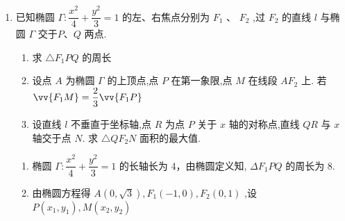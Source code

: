 \begin{enumerate}
\begin{jieda}
        同理,用 $- \dfrac{1}{k}$ 代上式中的 $k$ ,得 $\left| {AB}\right|  = \dfrac{2{a}^{2}\sqrt{1 + {k}^{2}}}{{a}^{2} + {k}^{2}}$ .
        
        由 $\left| {BC}\right|  = \left| {AB}\right|$ ,得 $\left| k\right| \left( {{a}^{2} + {k}^{2}}\right)  = 1 + {a}^{2}{k}^{2}$ . 又 $k < 0$ ,得 $\left( {k + 1}\right) \left\lbrack  {{k}^{2} + \left( {{a}^{2} - 1}\right) k}+1\right\rbrack  = 0$ . 
        
        当 ${\left( {a}^{2} - 1\right) }^{2} - 4 < 0$ ,即 $1 < a < \sqrt{3}$ 时,方程$\left( {k + 1}\right) \left\lbrack  {{k}^{2} + \left( {{a}^{2} - 1}\right) k}+1\right\rbrack  = 0$有唯一解 $k =  - 1$ ; 
        
        当 $a = \sqrt{3}$ 时,方程 ${k}^{2} + \left( {{a}^{2} - 1}\right) k + 1 = 0$ 的解为 $k =  - 1$ ,此时方程$\left( {k + 1}\right) \left\lbrack  {{k}^{2} + \left( {{a}^{2} - 1}\right) k}+1\right\rbrack  = 0$有唯一解 $k =  - 1$ ; 
        
        当 $a > \sqrt{3}$ 时,方程$\left( {k + 1}\right) \left\lbrack  {{k}^{2} + \left( {{a}^{2} - 1}\right) k}+1\right\rbrack  = 0$有三个不同解. 
        
        综上所述,当 $1 < a \leq  \sqrt{3}$ 时,最多作出一个满足条件的三角形; 当 $a > \sqrt{3}$ 时,最多可作出三个满足条件的三角形.
    \end{jieda}
    \item 已知椭圆 $\Gamma  : \dfrac{{x}^{2}}{4} + \dfrac{{y}^{2}}{3} = 1$ 的左、右焦点分别为 ${F}_{1}$ 、 ${F}_{2}$ ,过 ${F}_{2}$ 的直线 $l$ 与椭圆 $\Gamma$ 交于$P\text{、}Q$ 两点.
    \begin{enumerate}
        \item 求 $\bigtriangleup {F}_{1}{PQ}$ 的周长
        \item 设点 $A$ 为椭圆 $\Gamma$ 的上顶点,点 $P$ 在第一象限,点 $M$ 在线段 $A{F}_{2}$ 上. 若 $\vv{{F}_{1}M} = \dfrac{2}{3}\vv{{F}_{1}P}$
        \item 设直线 $l$ 不垂直于坐标轴,点 $R$ 为点 $P$ 关于 $x$ 轴的对称点,直线 ${QR}$ 与 $x$ 轴交于点 $N$. 求 $\bigtriangleup Q{F}_{2}N$ 面积的最大值.
    \end{enumerate}
    \begin{jieda}
        \begin{enumerate}
            \item 椭圆 $\Gamma  : \dfrac{{x}^{2}}{4} + \dfrac{{y}^{2}}{3} = 1$ 的长轴长为 4，由椭圆定义知, $\Delta {F}_{1}{PQ}$ 的周长为 8.
            \item 由椭圆方程得 $A\left( {0,\sqrt{3}}\right) ,{F}_{1}\left( {-1,0}\right) ,{F}_{2}\left( {0,1}\right)$ ,设 $P\left( {{x}_{1},{y}_{1}}\right) ,M\left( {{x}_{2},{y}_{2}}\right)$
            

\end{enumerate}
\end{jieda}
\end{enumerate}

